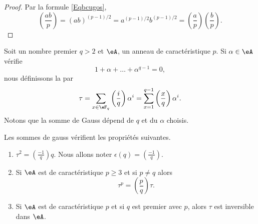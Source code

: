 \begin{proof}
    Par la formule \eqref{Eqbcugos},
    \begin{equation}
        \left(\frac{ab}{p}\right)=(ab)^{(p-1)/2}=a^{(p-1)/2}b^{(p-1)/2}=\left(\frac{a}{p}\right)\left(\frac{b}{p}\right).
    \end{equation}
\end{proof}

Soit un nombre premier \( q>2\) et \( \eA\), un anneau de caractéristique \( p\). Si \( \alpha\in \eA\) vérifie
\begin{equation}
    1+\alpha+\ldots+\alpha^{q-1}=0,
\end{equation}
nous définissons la  par
\begin{equation}
    \tau=\sum_{x\in \eF_q}\left(\frac{i}{q}\right)\alpha^i=\sum_{x=1}^{q-1}\left(\frac{x}{q}\right)\alpha^i.
\end{equation}
Notons que la somme de Gauss dépend de \( q\) et du \( \alpha\) choisis.

\begin{proposition} \label{PropciRUov}
    Les sommes de gauss vérifient les propriétés suivantes.
    \begin{enumerate}
        \item
            $\tau^2=\left(\frac{-1}{q}\right)q$. Nous allons noter \( \epsilon(q)=\left(\frac{-1}{q}\right)\).

        \item
            Si \( \eA\) est de caractéristique \( p\geq 3\) et si \( p\neq q\) alors
            \begin{equation}    \label{EqxBNpJz}
                \tau^p=\left(\frac{p}{q}\right)\tau.
            \end{equation}
        \item
            Si \( \eA\) est de caractéristique \( p\) et si \( q\) est premier avec \( p\), alors \( \tau\) est inversible dans \( \eA\).
    \end{enumerate}
\end{proposition}

